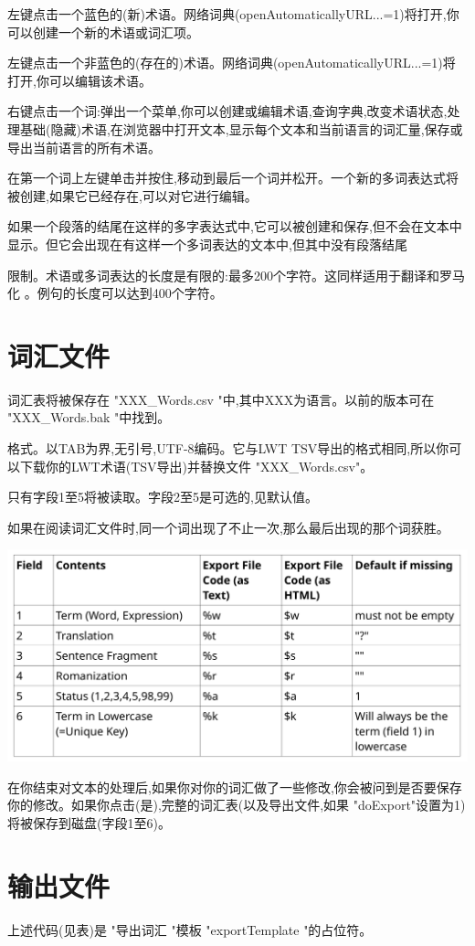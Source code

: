 \documentclass[cn,10pt,math=newtx,citestyle=gb7714-2015,bibstyle=gb7714-2015]{elegantbook}
\begin{document}
左键点击一个蓝色的(新)术语。网络词典(openAutomaticallyURL...=1)将打开,你可以创建一个新的术语或词汇项。

左键点击一个非蓝色的(存在的)术语。网络词典(openAutomaticallyURL...=1)将打开,你可以编辑该术语。

右键点击一个词:弹出一个菜单,你可以创建或编辑术语,查询字典,改变术语状态,处理基础(隐藏)术语,在浏览器中打开文本,显示每个文本和当前语言的词汇量,保存或导出当前语言的所有术语。

在第一个词上左键单击并按住,移动到最后一个词并松开。一个新的多词表达式将被创建,如果它已经存在,可以对它进行编辑。

如果一个段落的结尾在这样的多字表达式中,它可以被创建和保存,但不会在文本中显示。但它会出现在有这样一个多词表达的文本中,但其中没有段落结尾

限制。术语或多词表达的长度是有限的:最多200个字符。这同样适用于翻译和罗马化
。例句的长度可以达到400个字符。


\chapter{词汇文件}\label{词汇文件}
词汇表将被保存在 "XXX\_Words.csv "中,其中XXX为语言。以前的版本可在
"XXX\_Words.bak "中找到。

格式。以TAB为界,无引号,UTF-8编码。它与LWT TSV导出的格式相同,所以你可以下载你的LWT术语(TSV导出)并替换文件 "XXX\_Words.csv"。

只有字段1至5将被读取。字段2至5是可选的,见默认值。

如果在阅读词汇文件时,同一个词出现了不止一次,那么最后出现的那个词获胜。

\includegraphics[scale=0.3]{image/table3.png}

在你结束对文本的处理后,如果你对你的词汇做了一些修改,你会被问到是否要保存你的修改。如果你点击(是),完整的词汇表(以及导出文件,如果 "doExport"设置为1)将被保存到磁盘(字段1至6)。

\chapter{输出文件}\label{输出文件}
上述代码(见表)是 "导出词汇 "模板 "exportTemplate "的占位符。
\end{document}
